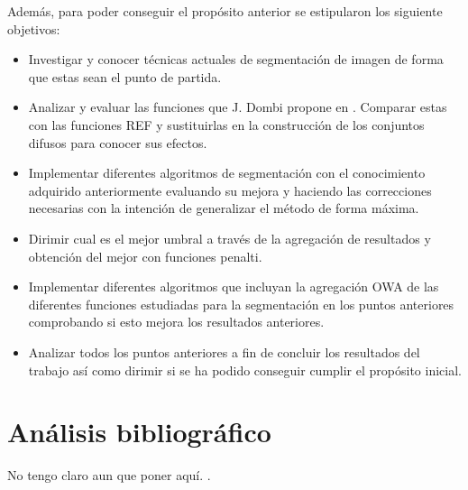 Además, para poder conseguir el propósito anterior se estipularon los siguiente objetivos:
\begin{itemize}
	\item Investigar y conocer técnicas actuales de segmentación de imagen de forma que estas sean el punto de partida.
	\item Analizar y evaluar las funciones que J. Dombi propone en \cite{art:dombi}. Comparar estas con las funciones REF y sustituirlas en la construcción de los conjuntos difusos para conocer sus efectos.
	\item Implementar diferentes algoritmos de segmentación con el conocimiento adquirido anteriormente evaluando su mejora y haciendo las correcciones necesarias con la intención de generalizar el método de forma máxima.
	\item Dirimir cual es el mejor umbral a través de la agregación de resultados y obtención del mejor con funciones penalti.
	\item Implementar diferentes algoritmos que incluyan la agregación OWA de las diferentes funciones estudiadas para la segmentación en los puntos anteriores comprobando si esto mejora los resultados anteriores.
	\item Analizar todos los puntos anteriores a fin de concluir los resultados del trabajo así como dirimir si se ha podido conseguir cumplir el propósito inicial.
\end{itemize}

\section{Análisis bibliográfico}
No tengo claro aun que poner aquí. .
